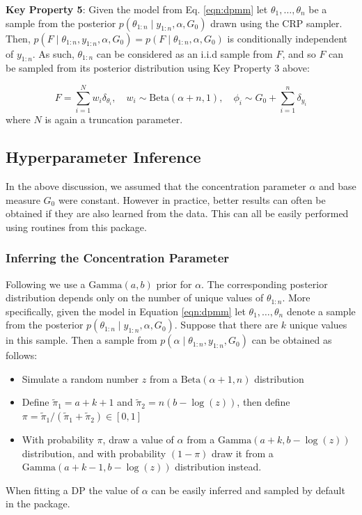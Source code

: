 \documentclass[nojss]{jss}
\begin{document}
\begin{tcolorbox}
\textbf{Key Property 5}: Given the model from Eq. \eqref{eqn:dpmm} let $\theta_1,\ldots,\theta_n$  be a sample from the posterior $p(\theta_{1:n} \mid y_{1:n},\alpha,G_0)$ drawn using the CRP sampler. Then, $p(F \mid \theta_{1:n},y_{1:n},\alpha,G_0) = p(F\mid\theta_{1:n},\alpha,G_0)$ is conditionally independent of $y_{1:n}$. As such, $\theta_{1:n}$ can be considered as an i.i.d sample from $F$, and so $F$ can be sampled from its posterior distribution using Key Property 3 above:

$$F = \sum_{i=1}^N w_i \delta_{\theta_i}, \quad w_i \sim \text{Beta}(\alpha+n,1), \quad \phi_i \sim G_0 + \sum_{i=1}^n \delta_{y_i}$$
where $N$ is again a truncation parameter.
\end{tcolorbox}


\subsection{Hyperparameter Inference} \label{subsec:hyperparam}

In the above discussion, we assumed that the concentration parameter $\alpha$ and base measure $G_0$ were constant. However in practice, better results can often be obtained if they are also learned from the data. This can all be easily performed using routines from this package.

\subsubsection{Inferring the Concentration Parameter}\label{subsubsec:concentration}
Following \cite{west_hyperparameter_1992} we use a $\text{Gamma} (a, b)$ prior for $\alpha$. The corresponding posterior distribution depends only on the number of unique values of $\theta_{1:n}$. More specifically, given the model in Equation \eqref{eqn:dpmm} let $\theta_1,\ldots,\theta_n$ denote a sample from the posterior $p(\theta_{1:n} \mid y_{1:n} , \alpha, G_0 )$. Suppose that there are $k$ unique values in this sample. Then a sample from $p(\alpha \mid \theta_{1:n}, y_{1:n} , G_0)$ can be obtained as follows:

\begin{itemize}
\item Simulate a random number $z$ from a $\text{Beta}(\alpha + 1, n)$ distribution
\item Define $\tilde{\pi}_1 = a + k + 1$ and $\tilde{\pi}_2 = n (b - \log(z))$, then define $\pi = \tilde{\pi}_1/(\tilde{\pi}_1 + \tilde{\pi}_2) \in [0, 1]$
\item With probability $\pi$, draw a value of $\alpha$ from a $\text{Gamma} (a + k, b - \log(z))$ distribution, and with probability $(1 - \pi)$ draw it from a $\text{Gamma}(a + k - 1, b - \log(z))$ distribution instead.
\end{itemize}
When fitting a DP the value of $\alpha$ can be easily inferred and sampled by default in the  package.
\end{document}
